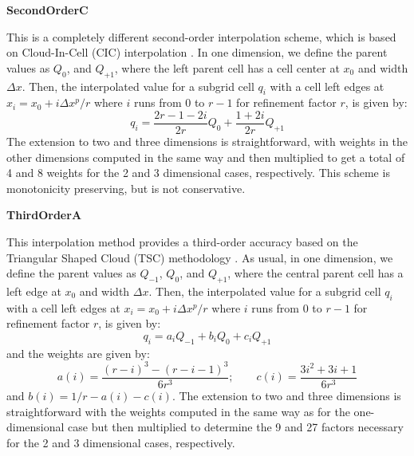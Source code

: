
\vspace{0.3cm}\noindent
{\bf SecondOrderC} 

This is a completely different second-order interpolation scheme, which is based on Cloud-In-Cell (CIC) interpolation \citep{Hockney88}.  In one dimension, we define the parent values as $Q_0$, and $Q_{+1}$, where the left parent cell has a cell center at $x_0$ and width $\Delta x$.  Then, the interpolated value for a subgrid cell $q_i$ with a cell left edges at $x_i = x_0 + i \Delta x^p/r$ where $i$ runs from 0 to $r-1$ for refinement factor $r$, is given by:
\begin{equation}
q_i =  \frac{2r - 1 - 2i}{2r} Q_0 + \frac{1+2i}{2r} Q_{+1}
\end{equation}
The extension to two and three dimensions is straightforward, with weights in the other dimensions computed in the same way and then multiplied to get a total of 4 and 8 weights for the 2 and 3 dimensional cases, respectively.  This scheme is monotonicity preserving, but is not conservative.


\vspace{0.3cm}\noindent
{\bf ThirdOrderA} 

This interpolation method provides a third-order accuracy based on the Triangular Shaped Cloud (TSC) methodology \citep{Hockney88}.  As usual, in one dimension, we define the parent values as $Q_{-1}$, $Q_0$, and $Q_{+1}$, where the central parent cell has a left edge at $x_0$ and width $\Delta x$.  Then, the interpolated value for a subgrid cell $q_i$ with a cell left edges at $x_i = x_0 + i \Delta x^p/r$ where $i$ runs from 0 to $r-1$ for refinement factor $r$, is given by:
\begin{equation}
q_i = a_i  Q_{-1} + b_i Q_0 + c_i Q_{+1}
\end{equation}
and the weights are given by:
\begin{equation}
a(i) =  \frac{(r-i)^3 - (r-i-1)^3}{6r^3}; \qquad c(i) = \frac{3i^2 + 3i + 1}{6r^3}
\end{equation}
and $b(i) = 1/r - a(i) - c(i)$.  The extension to two and three dimensions is straightforward with the weights computed in the same way as for the one-dimensional case but then multiplied to determine the 9 and 27 factors necessary for the 2 and 3 dimensional cases, respectively.

